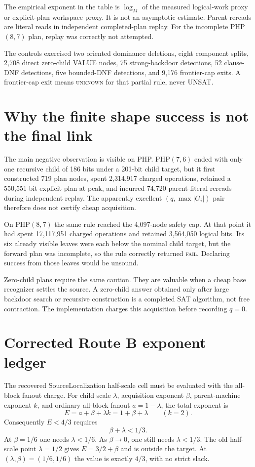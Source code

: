 \documentclass[11pt]{article}
\begin{document}
The empirical exponent in the table is $\log_M$ of the measured logical-work
proxy or explicit-plan workspace proxy.  It is not an asymptotic estimate.
Parent rereads are literal reads in independent completed-plan replay.  For
the incomplete PHP$(8,7)$ plan, replay was correctly not attempted.

The controls exercised two oriented dominance deletions, eight component
splits, 2,708 direct zero-child VALUE nodes, 75 strong-backdoor detections, 52
clause-DNF detections, five bounded-DNF detections, and 9,176 frontier-cap
exits.  A frontier-cap exit means \textsc{unknown} for that partial rule, never
UNSAT.

\section{Why the finite shape success is not the final link}

The main negative observation is visible on PHP.  PHP$(7,6)$ ended with only
one recursive child of 186 bits under a 201-bit child target, but it first
constructed 719 plan nodes, spent 2,314,917 charged operations, retained a
550,551-bit explicit plan at peak, and incurred 74,720 parent-literal rereads
during independent replay.  The apparently excellent $(q,\max|G_i|)$ pair
therefore does not certify cheap acquisition.

On PHP$(8,7)$ the same rule reached the 4,097-node safety cap.  At that point
it had spent 17,117,951 charged operations and retained 3,564,050 logical
bits.  Its six already visible leaves were each below the nominal child
target, but the forward plan was incomplete, so the rule correctly returned
\textsc{fail}.  Declaring success from those leaves would be unsound.

Zero-child plans require the same caution.  They are valuable when a cheap
base recognizer settles the source.  A zero-child answer obtained only after
large backdoor search or recursive construction is a completed SAT algorithm,
not free contraction.  The implementation charges this acquisition before
recording $q=0$.

\section{Corrected Route B exponent ledger}

The recovered SourceLocalization half-scale cell must be evaluated with the
all-block fanout charge.  For child scale $\lambda$, acquisition exponent
$\beta$, parent-machine exponent $k$, and ordinary all-block fanout
$a=1-\lambda$, the total exponent is
\[
       E=a+\beta+\lambda k
        =1+\beta+\lambda \qquad (k=2).
\]
Consequently $E<4/3$ requires
\[
       \boxed{\beta+\lambda<1/3}.
\]
At $\beta=1/6$ one needs $\lambda<1/6$.  As $\beta\to0$, one still needs
$\lambda<1/3$.  The old half-scale point $\lambda=1/2$ gives
$E=3/2+\beta$ and is outside the target.  At
$(\lambda,\beta)=(1/6,1/6)$ the value is exactly $4/3$, with no strict slack.
\end{document}
